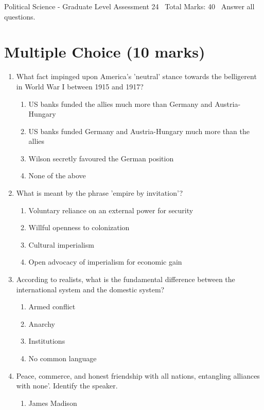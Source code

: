 \documentclass[12pt]{article}
\begin{document}
\begin{center}
Political Science - Graduate Level Assessment 24 \
Total Marks: 40 \
Answer all questions.
\end{center}

\section*{Multiple Choice (10 marks)}
\begin{enumerate}[label=\arabic*.]
\item What fact impinged upon America's 'neutral' stance towards the belligerent in World War I between 1915 and 1917?
\begin{enumerate}[label=(\alph*)]
    \item US banks funded the allies much more than Germany and Austria-Hungary
    \item US banks funded Germany and Austria-Hungary much more than the allies
    \item Wilson secretly favoured the German position
    \item None of the above
\end{enumerate}
\item What is meant by the phrase 'empire by invitation'?
\begin{enumerate}[label=(\alph*)]
    \item Voluntary reliance on an external power for security
    \item Willful openness to colonization
    \item Cultural imperialism
    \item Open advocacy of imperialism for economic gain
\end{enumerate}
\item According to realists, what is the fundamental difference between the international system and the domestic system?
\begin{enumerate}[label=(\alph*)]
    \item Armed conflict
    \item Anarchy
    \item Institutions
    \item No common language
\end{enumerate}
\item Peace, commerce, and honest friendship with all nations, entangling alliances with none'. Identify the speaker.
\begin{enumerate}[label=(\alph*)]
    \item James Madison

\end{enumerate}
\end{enumerate}
\end{document}
